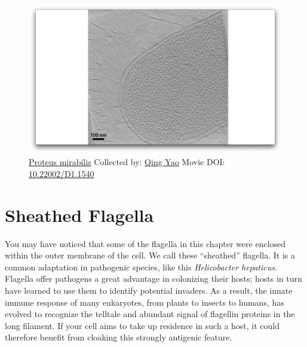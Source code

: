 \documentclass[]{tufte-book}
\begin{document}
\begin{figure}
\includegraphics{movie_stills/6_5a} \caption[\protect\hyperlink{tree}{Proteus mirabilis} Collected by:
\protect\hyperlink{qing_yao}{Qing Yao} Movie DOI:
\href{https://doi.org/10.22002/D1.1540}{10.22002/D1.1540}]{\protect\hyperlink{tree}{Proteus mirabilis} Collected by:
\protect\hyperlink{qing_yao}{Qing Yao} Movie DOI:
\href{https://doi.org/10.22002/D1.1540}{10.22002/D1.1540}}\label{fig:6-5a}
\end{figure}

\section{Sheathed Flagella}\label{sheathed-flagella}

You may have noticed that some of the flagella in this chapter were
enclosed within the outer membrane of the cell. We call these
``sheathed'' flagella. It is a common adaptation in pathogenic species,
like this \emph{Helicobacter hepaticus}. Flagella offer pathogens a
great advantage in colonizing their hosts; hosts in turn have learned to
use them to identify potential invaders. As a result, the innate immune
response of many eukaryotes, from plants to insects to humans, has
evolved to recognize the telltale and abundant signal of flagellin
proteins in the long filament. If your cell aims to take up residence in
such a host, it could therefore benefit from cloaking this strongly
antigenic feature.
\end{document}
